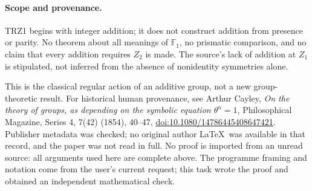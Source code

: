 \paragraph{Scope and provenance.}
TRZ1 begins with integer addition; it does not construct addition from presence or parity. No theorem about all meanings of $\mathbb F_1$, no prismatic comparison, and no claim that every addition requires $Z_2$ is made. The source's lack of addition at $Z_1$ is stipulated, not inferred from the absence of nonidentity symmetries alone.

This is the classical regular action of an additive group, not a new group-theoretic result. For historical human provenance, see Arthur Cayley, \emph{On the theory of groups, as depending on the symbolic equation $\theta^n=1$}, Philosophical Magazine, Series 4, 7(42) (1854), 40--47,
\href{https://doi.org/10.1080/14786445408647421}{doi:10.1080/14786445408647421}.
Publisher metadata was checked; no original author \LaTeX\ was available in that record, and the paper was not read in full. No proof is imported from an unread source: all arguments used here are complete above. The programme framing and notation come from the user's current request; this task wrote the proof and obtained an independent mathematical check.

